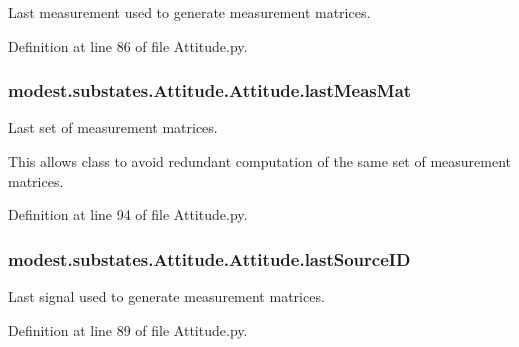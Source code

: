 Last measurement used to generate measurement matrices. 



Definition at line 86 of file Attitude.\+py.

\subsubsection[{\texorpdfstring{last\+Meas\+Mat}{lastMeasMat}}]{\setlength{\rightskip}{0pt plus 5cm}modest.\+substates.\+Attitude.\+Attitude.\+last\+Meas\+Mat}\hypertarget{classmodest_1_1substates_1_1Attitude_1_1Attitude_a2fb7f9e39f2c8e65c73462b222c84bab}{}\label{classmodest_1_1substates_1_1Attitude_1_1Attitude_a2fb7f9e39f2c8e65c73462b222c84bab}


Last set of measurement matrices. 

This allows class to avoid redundant computation of the same set of measurement matrices. 

Definition at line 94 of file Attitude.\+py.

\subsubsection[{\texorpdfstring{last\+Source\+ID}{lastSourceID}}]{\setlength{\rightskip}{0pt plus 5cm}modest.\+substates.\+Attitude.\+Attitude.\+last\+Source\+ID}\hypertarget{classmodest_1_1substates_1_1Attitude_1_1Attitude_a50fa274b70c9184ef95b535919694d50}{}\label{classmodest_1_1substates_1_1Attitude_1_1Attitude_a50fa274b70c9184ef95b535919694d50}


Last signal used to generate measurement matrices. 



Definition at line 89 of file Attitude.\+py.

